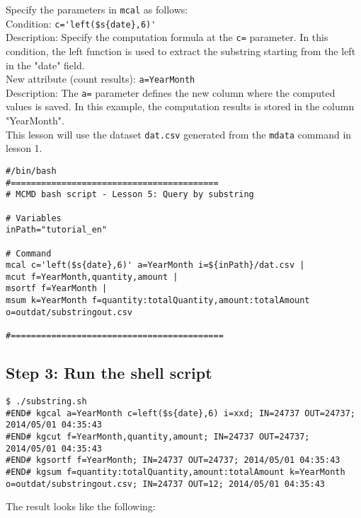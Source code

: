 {\setlength{\parindent}{0cm}

Specify the parameters in \verb|mcal| as follows: \\

Condition: 	\verb|c='left($s{date},6)'|\\
Description: 	Specify the computation formula at the \verb|c=| parameter. In this condition, the left function is used to extract the substring starting from the left in the "date" field.  \\

New attribute (count results): 	\verb|a=YearMonth| \\
Description:  		The \verb|a=| parameter defines the new column where the computed values is saved. In this example, the computation results is stored in the column "YearMonth". \\

This lesson will use the dataset \verb|dat.csv| generated from the \verb|mdata| command in lesson 1. 
}

\begin{verbatim}
#/bin/bash
#=========================================
# MCMD bash script - Lesson 5: Query by substring

# Variables
inPath="tutorial_en"

# Command 
mcal c='left($s{date},6)' a=YearMonth i=${inPath}/dat.csv |
mcut f=YearMonth,quantity,amount |
msortf f=YearMonth |
msum k=YearMonth f=quantity:totalQuantity,amount:totalAmount o=outdat/substringout.csv

#==========================================
\end{verbatim}

\subsection{Step 3: Run the shell script }

\begin{verbatim}
$ ./substring.sh 
#END# kgcal a=YearMonth c=left($s{date},6) i=xxd; IN=24737 OUT=24737; 2014/05/01 04:35:43
#END# kgcut f=YearMonth,quantity,amount; IN=24737 OUT=24737; 2014/05/01 04:35:43
#END# kgsortf f=YearMonth; IN=24737 OUT=24737; 2014/05/01 04:35:43
#END# kgsum f=quantity:totalQuantity,amount:totalAmount k=YearMonth o=outdat/substringout.csv; IN=24737 OUT=12; 2014/05/01 04:35:43
\end{verbatim}

\noindent
The result looks like the following: 

